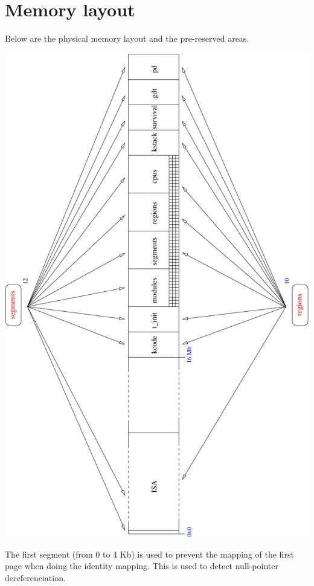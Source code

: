 %
%

\section{Memory layout}

Below are the physical memory layout and the pre-reserved areas.

\begin{center}
  \includegraphics[angle=-90,width=\linewidth]{figures/k1-memory-layout.pdf}
\end{center}

The first segment (from 0 to 4 Kb) is used to prevent the mapping of
the first page when doing the identity mapping. This is used to detect
null-pointer dereferenciation.
